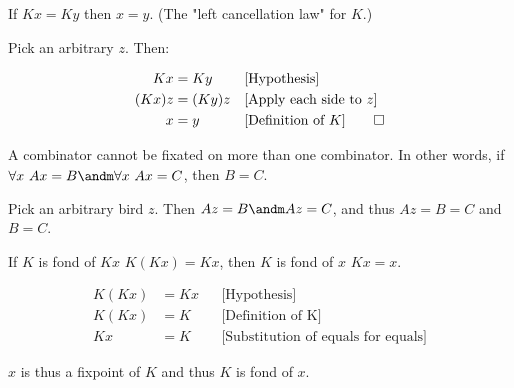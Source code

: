 
\begin{thm}

If $Kx = Ky$ then $x = y$.  (The "left cancellation law" for $K$.)

\bp

Pick an arbitrary $z$.  Then:

\begin{align*}
     Kx &= Ky      && \text{[Hypothesis]}  \\
  (Kx)z &= (Ky)z   && \text{[Apply each side to $z$]}  \\
      x &= y       && \text{[Definition of $K$]}   \qedhere
\end{align*}

\ep

\end{thm}


\begin{thm}

A combinator cannot be fixated on more than one combinator.  In other words,
if $\forall x\ Ax = B \andm \forall x\ Ax = C$, then $B = C$.

\bp

Pick an arbitrary bird $z$.  Then $Az = B \andm Az = C$, and thus $Az = B = C$
and $B = C$. \qedhere

\ep

\end{thm}


\begin{thm}

If $K$ is fond of $Kx$ \ie $K(Kx) = Kx$, then $K$ is fond of $x$ \ie $Kx = x$.

\bp

\begin{align*}
     K(Kx) &= Kx && \text{[Hypothesis]} \\
     K(Kx) &= K  && \text{[Definition of K]} \\
        Kx &= K  && \text{[Substitution of equals for equals]}
\end{align*}

\ni $x$ is thus a fixpoint of $K$ and thus $K$ is fond of $x$.  \qedhere

\ep

\end{thm}


